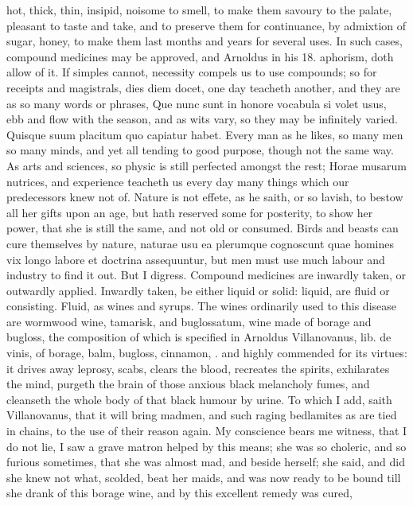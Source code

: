 {hot, thick, thin, insipid, noisome to smell, to make them savoury to
the palate, pleasant to taste and take, and to preserve them for
continuance, by admixtion of sugar, honey, to make them last months and
years for several uses. In such cases, compound medicines may be
approved, and Arnoldus in his 18. aphorism, doth allow of it. If
simples cannot, necessity compels us to use compounds; so for receipts
and magistrals, dies diem docet, one day teacheth another, and they are
as so many words or phrases, Que nunc sunt in honore vocabula si volet
usus, ebb and flow with the season, and as wits vary, so they may be
infinitely varied. Quisque suum placitum quo capiatur habet. Every man
as he likes, so many men so many minds, and yet all tending to good
purpose, though not the same way. As arts and sciences, so physic is
still perfected amongst the rest; Horae musarum nutrices, and
experience teacheth us every day many things which our
predecessors knew not of. Nature is not effete, as he saith, or so
lavish, to bestow all her gifts upon an age, but hath reserved some for
posterity, to show her power, that she is still the same, and not old
or consumed. Birds and beasts can cure themselves by nature,
naturae usu ea plerumque cognoscunt quae homines vix longo labore
et doctrina assequuntur, but men must use much labour and industry to
find it out. But I digress.
Compound medicines are inwardly taken, or outwardly applied. Inwardly
taken, be either liquid or solid: liquid, are fluid or consisting.
Fluid, as wines and syrups. The wines ordinarily used to this disease
are wormwood wine, tamarisk, and buglossatum, wine made of borage and
bugloss, the composition of which is specified in Arnoldus
Villanovanus, lib. de vinis, of borage, balm, bugloss, cinnamon, \etc{}.
and highly commended for its virtues: it drives away leprosy,
scabs, clears the blood, recreates the spirits, exhilarates the mind,
purgeth the brain of those anxious black melancholy fumes, and
cleanseth the whole body of that black humour by urine. To which I add,
saith Villanovanus, that it will bring madmen, and such raging
bedlamites as are tied in chains, to the use of their reason again. My
conscience bears me witness, that I do not lie, I saw a grave matron
helped by this means; she was so choleric, and so furious sometimes,
that she was almost mad, and beside herself; she said, and did she knew
not what, scolded, beat her maids, and was now ready to be bound till
she drank of this borage wine, and by this excellent remedy was cured,
}
